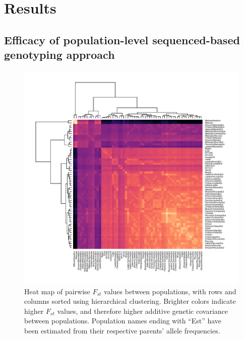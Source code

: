 \documentclass[12pt, letterpaper]{article}
\begin{document}
\section{Results}



\subsection{Efficacy of population-level sequenced-based genotyping approach}
\begin{figure}
\includegraphics[width = \linewidth, clip, trim = 0cm 0cm 0cm 4cm]{Fig1USAFRIupdate}
\caption{Heat map of pairwise $F_{st}$ values between populations, with rows and columns sorted using hierarchical clustering. Brighter colors indicate higher $F_{st}$ values, and therefore higher additive genetic covariance between populations. Population names ending with ``Est'' have been estimated from their respective parents' allele frequencies.}
\label{heatmap}
\end{figure}
\end{document}

